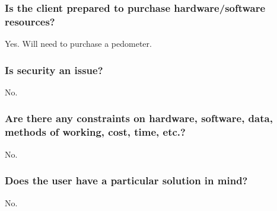 \subsubsection{Is the client prepared to purchase hardware/software resources?}
Yes. Will need to purchase a pedometer.

\subsubsection{Is security an issue?}
No.

\subsubsection{Are there any constraints on hardware, software, data, methods of working, cost, time, etc.?}
No.

\subsubsection{Does the user have a particular solution in mind?}
No.
\newpage

